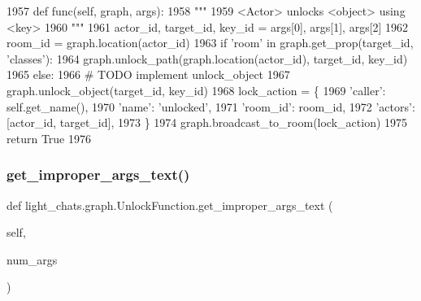 \begin{DoxyCode}
1957     \textcolor{keyword}{def }func(self, graph, args):
1958         \textcolor{stringliteral}{"""}
1959 \textcolor{stringliteral}{        <Actor> unlocks <object> using <key>}
1960 \textcolor{stringliteral}{        """}
1961         actor\_id, target\_id, key\_id = args[0], args[1], args[2]
1962         room\_id = graph.location(actor\_id)
1963         \textcolor{keywordflow}{if} \textcolor{stringliteral}{'room'} \textcolor{keywordflow}{in} graph.get\_prop(target\_id, \textcolor{stringliteral}{'classes'}):
1964             graph.unlock\_path(graph.location(actor\_id), target\_id, key\_id)
1965         \textcolor{keywordflow}{else}:
1966             \textcolor{comment}{# TODO implement unlock\_object}
1967             graph.unlock\_object(target\_id, key\_id)
1968         lock\_action = \{
1969             \textcolor{stringliteral}{'caller'}: self.get\_name(),
1970             \textcolor{stringliteral}{'name'}: \textcolor{stringliteral}{'unlocked'},
1971             \textcolor{stringliteral}{'room\_id'}: room\_id,
1972             \textcolor{stringliteral}{'actors'}: [actor\_id, target\_id],
1973         \}
1974         graph.broadcast\_to\_room(lock\_action)
1975         \textcolor{keywordflow}{return} \textcolor{keyword}{True}
1976 
\end{DoxyCode}
\mbox{\label{classlight__chats_1_1graph_1_1UnlockFunction_a25cc5dcf53d2d9bc588ab635aeb376eb}} 
\subsubsection{\texorpdfstring{get\+\_\+improper\+\_\+args\+\_\+text()}{get\_improper\_args\_text()}}
{\footnotesize\ttfamily def light\+\_\+chats.\+graph.\+Unlock\+Function.\+get\+\_\+improper\+\_\+args\+\_\+text (\begin{DoxyParamCaption}\item[{}]{self,  }\item[{}]{num\+\_\+args }\end{DoxyParamCaption})}



